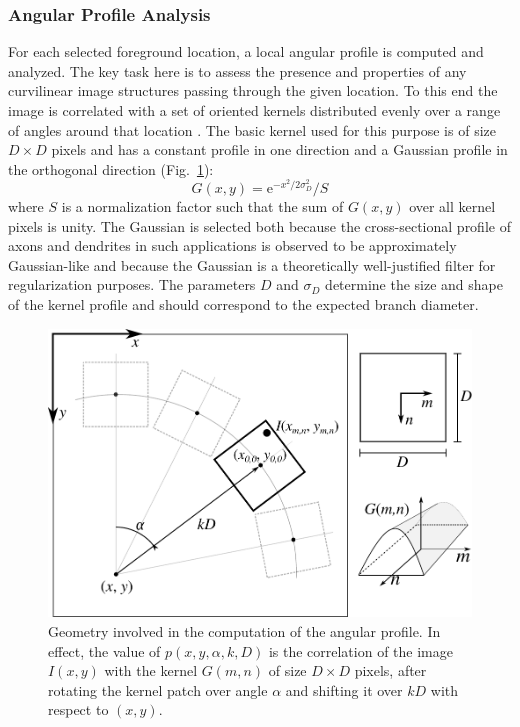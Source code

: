 \subsubsection{Angular Profile Analysis}
\label{subsubsec:angular-profile}
For each selected foreground location, a local angular profile is computed and analyzed. The key task here is to assess the presence and properties of any curvilinear image structures passing through the given location. To this end the image is correlated with a set of oriented kernels distributed evenly over a range of angles around that location \cite{radojevic2014fuzzy}. The basic kernel used for this purpose is of size $D\times D$ pixels and has a constant profile in one direction and a Gaussian profile in the orthogonal direction (Fig.~\ref{fig3}):
\begin{equation}
G(x,y)=\textrm{e}^{-x^2/2\sigma_{\!\!D}^{2}}/S
\label{eq:G}
\end{equation}
where $S$ is a normalization factor such that the sum of $G(x,y)$ over all kernel pixels is unity. The Gaussian is selected both because the cross-sectional profile of axons and dendrites in such applications is observed to be approximately Gaussian-like and because the Gaussian is a theoretically well-justified filter for regularization purposes. The parameters $D$ and $\sigma_{\!D}$ determine the size and shape of the kernel profile and should correspond to the expected branch diameter.

\begin{figure}[!t]
	\centering
	\includegraphics[width=0.5\columnwidth]{fig3}
	\caption{Geometry involved in the computation of the angular profile. In effect, the value of $p(x,y,\alpha,k,D)$ is the correlation of the image $I(x,y)$ with the kernel $G(m,n)$ of size $D\times D$ pixels, after rotating the kernel patch over angle $\alpha$ and shifting it over $kD$ with respect to $(x,y)$.}
	\label{fig3}
\end{figure}


